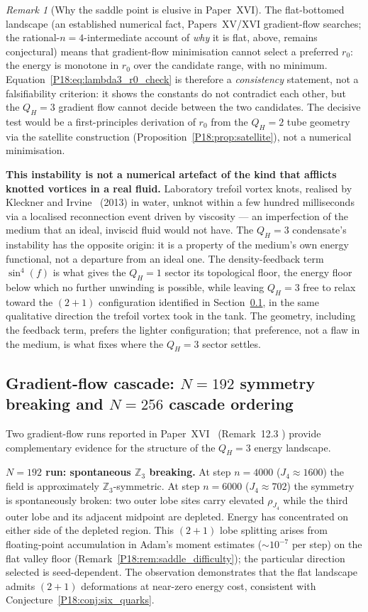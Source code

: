 \documentclass[11pt,a4paper]{article}
\theoremstyle{definition}\newtheorem{definition}[theorem]{Definition}
\theoremstyle{remark}
\newtheorem{remark}[theorem]{Remark}
\newcommand{\QH}{Q_H}
\newcommand{\Zthree}{\mathbb{Z}_3}
\begin{document}
\begin{remark}[Why the saddle point is elusive in Paper~XVI]
The flat-bottomed landscape (an established numerical fact, Papers~XV/XVI
gradient-flow searches; the rational-$n=4$-intermediate account of
\emph{why} it is flat, above, remains conjectural) means that
gradient-flow minimisation cannot select a preferred $r_0$: the
energy is monotone in $r_0$ over the candidate range, with no minimum.  Equation~\eqref{P18:eq:lambda3_r0_check} is
therefore a \emph{consistency} statement, not a falsifiability
criterion: it shows the constants do not contradict each other, but
the $\QH=3$ gradient flow cannot decide between the two candidates.
The decisive test would be a first-principles derivation of $r_0$
from the $\QH=2$ tube geometry via the satellite construction
(Proposition~\ref{P18:prop:satellite}), not a numerical minimisation.

\textbf{This instability is not a numerical artefact of the kind that
afflicts knotted vortices in a real fluid.} Laboratory trefoil vortex
knots, realised by Kleckner and Irvine~\cite{Kleckner2013} (2013) in water, unknot within a
few hundred milliseconds via a localised reconnection event driven by
viscosity --- an imperfection of the medium that an ideal, inviscid
fluid would not have. The $\QH=3$ condensate's instability has the
opposite origin: it is a property of the medium's own energy
functional, not a departure from an ideal one. The density-feedback
term $\sin^4(f)$ is what gives the $\QH=1$ sector its topological
floor, the energy floor below which no further unwinding is possible,
while leaving $\QH=3$ free to relax toward the $(2{+}1)$ configuration
identified in Section~\ref{P18:sec:z3_drift}, in the same qualitative
direction the trefoil vortex took in the tank. The geometry, including
the feedback term, prefers the lighter configuration; that preference,
not a flaw in the medium, is what fixes where the $\QH=3$ sector
settles.
\end{remark}

\subsection{Gradient-flow cascade: $N=192$ symmetry breaking and $N=256$ cascade ordering}
\label{P18:sec:z3_drift}
Two gradient-flow runs reported in Paper~XVI~\cite{Paper16}
(Remark~12.3%
) provide complementary evidence for the structure of the $\QH=3$ energy
landscape.

\textbf{$N=192$ run: spontaneous $\Zthree$ breaking.}
At step $n=4000$ ($J_4\approx1600$) the field is approximately
$\Zthree$-symmetric.  At step $n=6000$ ($J_4\approx702$) the symmetry
is spontaneously broken: two outer lobe sites carry elevated $\rho_{J_4}$
while the third outer lobe and its adjacent midpoint are depleted.
Energy has concentrated on either side of the depleted region.
This $(2{+}1)$ lobe splitting arises from floating-point accumulation in
Adam's moment estimates ($\sim10^{-7}$ per step) on the flat valley floor
(Remark~\ref{P18:rem:saddle_difficulty}); the particular direction selected is
seed-dependent.  The observation demonstrates that the flat landscape
admits $(2{+}1)$ deformations at near-zero energy cost, consistent with
Conjecture~\ref{P18:conj:six_quarks}.
\end{document}
